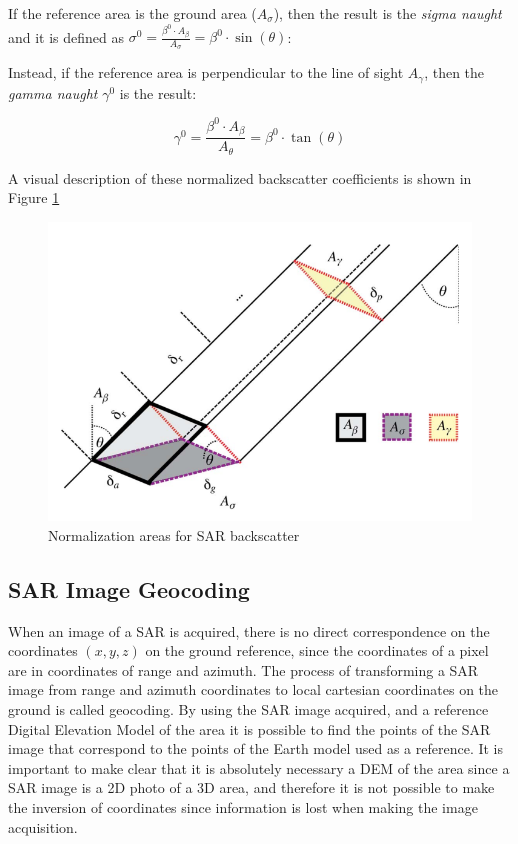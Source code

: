 If the reference area is the ground area ($A_\sigma$), then the result is the \textit{sigma naught} and it is defined as $\sigma^0 = \frac{\beta^0 \cdot A_\beta}{A_\sigma} = \beta^0 \cdot \sin(\theta)$:


Instead, if the reference area is perpendicular to the line of sight $A_\gamma$, then the \textit{gamma naught} $\gamma^0$ is the result:

\begin{equation}
    \gamma^0 = \frac{\beta^0 \cdot A_\beta}{A_\theta} = \beta^0 \cdot \tan(\theta)
\end{equation}{}

A visual description of these normalized backscatter coefficients is shown in Figure \ref{fig:normalization_areas}

\begin{figure}[H]
    \centering
    \includegraphics[width=0.8\linewidth]{Cap1/retang.png}
    \caption{Normalization areas for SAR backscatter \cite{Small}}
    \label{fig:normalization_areas}
\end{figure}


\subsection{SAR Image Geocoding}
\label{sec:sar_geocoding}

When an image of a SAR is acquired, there is no direct correspondence on the coordinates $(x,y,z)$ on the ground reference, since the coordinates of a pixel are in coordinates of range and azimuth. The process of transforming a SAR image from range and azimuth coordinates to local cartesian coordinates on the ground is called geocoding. By using the SAR image acquired, and a reference Digital Elevation Model of the area it is possible to find the points of the SAR image that correspond to the points of the Earth model used as a reference. It is important to make clear that it is absolutely necessary a DEM of the area since a SAR image is a 2D photo of a 3D area, and therefore it is not possible to make the inversion of coordinates since information is lost when making the image acquisition.

